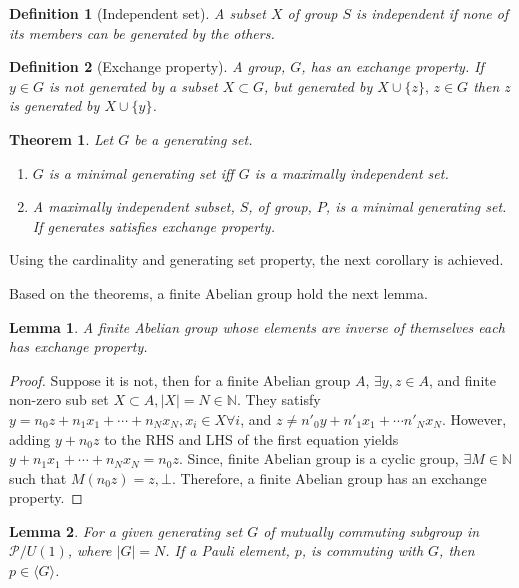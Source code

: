 \documentclass[a4paper,12pt]{article}
\newtheorem{theorem}{Theorem}
\newtheorem{lemma}{Lemma}
\newtheorem{definition}{Definition}
\begin{document}
\begin{definition}[Independent set]
    A subset $X$ of group $S$ is independent if none of its members can be generated by the others.
\end{definition}

\begin{definition}[Exchange property]
    A group, $G$, has an exchange property. 
    If $y \in G$ is not generated by a subset $X\subset G$,
    but generated by $X \cup \{z\}, \, z\in G$ then $z$ is generated by $X \cup \{y\}$.
\end{definition}

\begin{theorem}
        \label{theorem:generating_independent_set}
        Let $G$ be a generating set.

        \begin{enumerate}
            \item $G$ is a minimal generating set iff $G$ is a maximally independent set.
            \item A maximally independent subset, $S$, of group, $P$, is a minimal generating set. If generates satisfies exchange property.  
        \end{enumerate}
\end{theorem}

Using the cardinality and generating set property, the next corollary is achieved.

Based on the theorems, a finite Abelian group hold the next lemma.
\begin{lemma}
    \label{lemma:exchange_property}
    A finite Abelian group whose elements are inverse of themselves each has exchange property.
\end{lemma}
\begin{proof}
        Suppose it is not, then for a finite Abelian group $A$, $\exists y, z \in A$, and finite non-zero sub set $X \subset A, |X| = N \in \mathbb{N}$. 
        They satisfy $y = n_0 z + n_1 x_1 + \cdots + n_N x_N, x_i \in X \forall i$, and $z \neq n'_0 y + n'_1 x_1 + \cdots n'_N x_N$.
        However, adding $y + n_0 z$ to the RHS and LHS of the first equation yields 
        $y + n_1 x_1 + \cdots + n_N x_N = n_0 z$.
        Since, finite Abelian group is a cyclic group, $\exists M \in \mathbb{N}$ such that
        $M (n_0 z) = z, \bot$.
        Therefore, a finite Abelian group has an exchange property.
\end{proof}



\begin{lemma}
    \label{lemma:element_in_commuting}
    For a given generating set $G$ of mutually commuting subgroup in $\mathcal{P}/U(1)$, where $|G| = N$.
    If a Pauli element, $p$, is commuting with $G$,
    then $p \in \langle G \rangle$.
\end{lemma}
\end{document}
